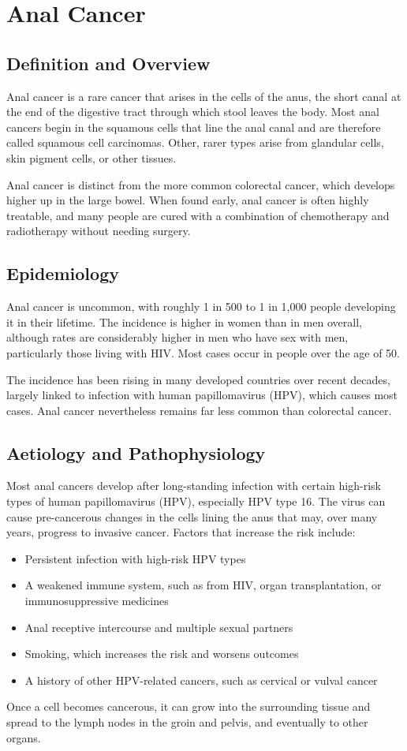 \chapter{Anal Cancer}

\section*{Definition and Overview}
Anal cancer is a rare cancer that arises in the cells of the anus, the short canal at the end of the digestive tract through which stool leaves the body. Most anal cancers begin in the squamous cells that line the anal canal and are therefore called squamous cell carcinomas. Other, rarer types arise from glandular cells, skin pigment cells, or other tissues.

Anal cancer is distinct from the more common colorectal cancer, which develops higher up in the large bowel. When found early, anal cancer is often highly treatable, and many people are cured with a combination of chemotherapy and radiotherapy without needing surgery.

\section*{Epidemiology}
Anal cancer is uncommon, with roughly 1 in 500 to 1 in 1,000 people developing it in their lifetime. The incidence is higher in women than in men overall, although rates are considerably higher in men who have sex with men, particularly those living with HIV. Most cases occur in people over the age of 50.

The incidence has been rising in many developed countries over recent decades, largely linked to infection with human papillomavirus (HPV), which causes most cases. Anal cancer nevertheless remains far less common than colorectal cancer.

\section*{Aetiology and Pathophysiology}
Most anal cancers develop after long-standing infection with certain high-risk types of human papillomavirus (HPV), especially HPV type 16. The virus can cause pre-cancerous changes in the cells lining the anus that may, over many years, progress to invasive cancer. Factors that increase the risk include:
\begin{itemize}
    \item Persistent infection with high-risk HPV types
    \item A weakened immune system, such as from HIV, organ transplantation, or immunosuppressive medicines
    \item Anal receptive intercourse and multiple sexual partners
    \item Smoking, which increases the risk and worsens outcomes
    \item A history of other HPV-related cancers, such as cervical or vulval cancer
\end{itemize}
Once a cell becomes cancerous, it can grow into the surrounding tissue and spread to the lymph nodes in the groin and pelvis, and eventually to other organs.

